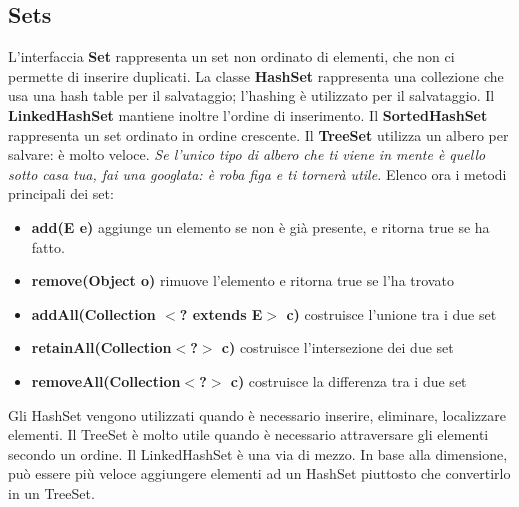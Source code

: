 \documentclass[11pt]{article}
\begin{document}
 \subsection{Sets}
 L'interfaccia \textbf{Set} rappresenta un set non ordinato di elementi, che non ci permette di inserire duplicati. La classe \textbf{HashSet} rappresenta una collezione che usa una hash table per il salvataggio; l'hashing è utilizzato per il salvataggio. Il \textbf{LinkedHashSet} mantiene inoltre l'ordine di inserimento. Il \textbf{SortedHashSet} rappresenta un set ordinato in ordine crescente. Il \textbf{TreeSet} utilizza un albero per salvare: è molto veloce. \textit{Se l'unico tipo di albero che ti viene in mente è quello sotto casa tua, fai una googlata: è roba figa e ti tornerà utile.} 
 Elenco ora i metodi principali dei set:
 \begin{itemize}
     \item \textbf{add(E e)} aggiunge un elemento se non è già presente, e ritorna true se ha fatto.
     \item \textbf{remove(Object o)} rimuove l'elemento e ritorna true se l'ha trovato
     \item \textbf{addAll(Collection $<$? extends E$>$ c)} costruisce l'unione tra i due set 
     \item \textbf{retainAll(Collection$<$?$>$ c)} costruisce l'intersezione dei due set
     \item \textbf{removeAll(Collection$<$?$>$ c)} costruisce la differenza tra i due set
 \end{itemize}
 Gli HashSet vengono utilizzati quando è necessario inserire, eliminare, localizzare elementi. Il TreeSet è molto utile quando è necessario attraversare gli elementi secondo un ordine. Il LinkedHashSet è una via di mezzo. In base alla dimensione, può essere più veloce aggiungere elementi ad un HashSet piuttosto che convertirlo in un TreeSet.
\end{document}
